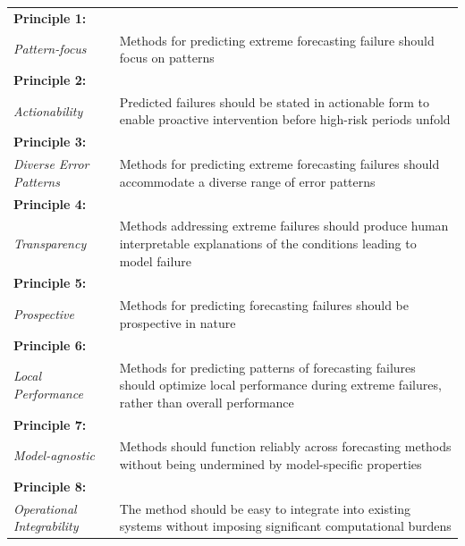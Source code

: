 \documentclass[12pt]{article}
\let\oldtable\table
\let\endoldtable\endtable
\renewenvironment{table}
  {\oldtable\spacingset{1}}
  {\endoldtable}
\begin{document}
\begin{table}
\centering
\caption{\textit{Guiding Principles for Methods that Forecast Forecasting Failures.}}
\small
\renewcommand{\arraystretch}{1.3}
\begin{tabular}{|m{2.7cm}|m{12.5cm}|}
\hline
\centering\textbf{Principle 1:} \\ \centering\textit{Pattern-focus} & Methods for predicting extreme forecasting failure should focus on patterns \\
\hline
\centering\textbf{Principle 2:} \\ \centering\textit{Actionability} & Predicted failures should be stated in actionable form to enable proactive intervention before high-risk periods unfold \\
\hline
\centering\textbf{Principle 3:} \\ \centering\textit{Diverse Error Patterns} & Methods for predicting extreme forecasting failures should accommodate a diverse range of error patterns \\
\hline
\centering\textbf{Principle 4:} \\ \centering\textit{Transparency} & Methods addressing extreme failures should produce human interpretable explanations of the conditions leading to model failure \\
\hline
\centering\textbf{Principle 5:} \\ \centering\textit{Prospective} & Methods for predicting forecasting failures should be prospective in nature \\
\hline
\centering\textbf{Principle 6:} \\ \centering\textit{Local Performance} & Methods for predicting patterns of forecasting failures should optimize local performance during extreme failures, rather than overall performance \\
\hline
\centering\textbf{Principle 7:} \\ \centering\textit{Model-agnostic} & Methods should function reliably across forecasting methods without being undermined by model-specific properties \\
\hline
\centering\textbf{Principle 8:} \\ \centering\textit{Operational Integrability} & The method should be easy to integrate into existing  systems without \newline imposing significant computational burdens \\
\hline
\end{tabular}
\label{tab:principles}
\end{table}
\end{document}
